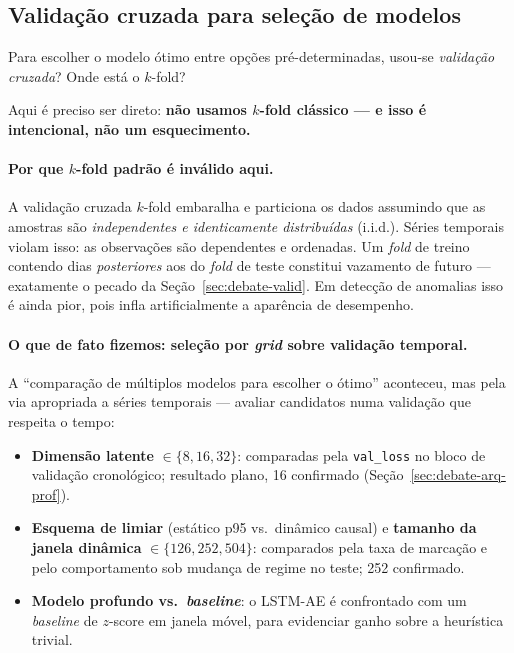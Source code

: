 \subsection{Validação cruzada para seleção de modelos}
\label{sec:debate-valid-cv}

\begin{confronto}
Para escolher o modelo ótimo entre opções pré-determinadas, usou-se
\emph{validação cruzada}? Onde está o $k$-fold?
\end{confronto}

Aqui é preciso ser direto: \textbf{não usamos $k$-fold clássico --- e isso é
intencional, não um esquecimento.}

\paragraph{Por que $k$-fold padrão é inválido aqui.}
A validação cruzada $k$-fold embaralha e particiona os dados assumindo que as
amostras são \emph{independentes e identicamente distribuídas} (i.i.d.). Séries
temporais violam isso: as observações são dependentes e ordenadas. Um \emph{fold}
de treino contendo dias \emph{posteriores} aos do \emph{fold} de teste constitui
vazamento de futuro --- exatamente o pecado da Seção~\ref{sec:debate-valid}. Em
detecção de anomalias isso é ainda pior, pois infla artificialmente a aparência
de desempenho.

\paragraph{O que de fato fizemos: seleção por \emph{grid} sobre validação temporal.}
A ``comparação de múltiplos modelos para escolher o ótimo'' aconteceu, mas pela
via apropriada a séries temporais --- avaliar candidatos numa validação que
respeita o tempo:
\begin{itemize}[noitemsep]
  \item \textbf{Dimensão latente} $\in\{8,16,32\}$: comparadas pela
        \texttt{val\_loss} no bloco de validação cronológico; resultado plano,
        16 confirmado (Seção~\ref{sec:debate-arq-prof}).
  \item \textbf{Esquema de limiar} (estático p95 vs.\ dinâmico causal) e
        \textbf{tamanho da janela dinâmica} $\in\{126,252,504\}$: comparados pela
        taxa de marcação e pelo comportamento sob mudança de regime no teste; 252
        confirmado.
  \item \textbf{Modelo profundo vs.\ \emph{baseline}}: o LSTM-AE é confrontado
        com um \emph{baseline} de $z$-score em janela móvel, para evidenciar
        ganho sobre a heurística trivial.
\end{itemize}


